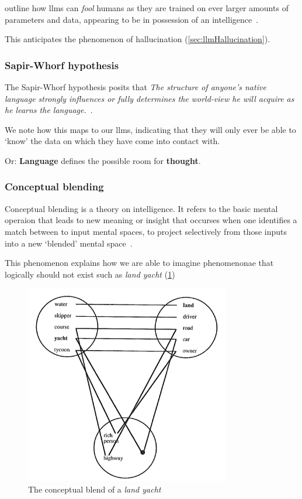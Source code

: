 \citeauthor{parrot} outline how \acrshort{llms} can \textit{fool} humans as they
are trained on ever larger amounts of parameters and data, appearing to be in possession of an
intelligence~\cite[610-611]{parrot}.

This anticipates the phenomenon of hallucination (\cref{sec:llmHallucination}).

\subsubsection*{Sapir-Whorf hypothesis}

The Sapir-Whorf hypothesis posits that  \textit{The structure of anyone’s native
    language strongly influences or fully determines the world-view he will acquire
    as he learns the language.}~\cite[128]{sapirWhorf}.

We note how this maps to our \acrshort{llms}, indicating that they will only ever
be able to `know' the data on which they have come into contact with.

Or: \textbf{Language} defines the possible room for \textbf{thought}.


\subsubsection*{Conceptual blending}

Conceptual blending is a theory on intelligence. It refers to the basic mental
operaion that leads to new meaning or insight that occurses when one identifies
a match between to input mental spaces, to project selectively from those inputs
into a new `blended' mental space~\cite[57-58]{conceptBlending}.

This phenomenon explains how we are able to imagine phenomenonae that logically
should not exist such as \textit{land yacht} (\cref{fig:landYacht})

\begin{figure}[h]
    \centering
    \includegraphics[width=0.8\textwidth]{media/landYacht.png}
    \caption[Land yacht conceptual blend]{The conceptual blend of a \textit{land
            yacht}\footnotemark}\label{fig:landYacht}
\end{figure}


